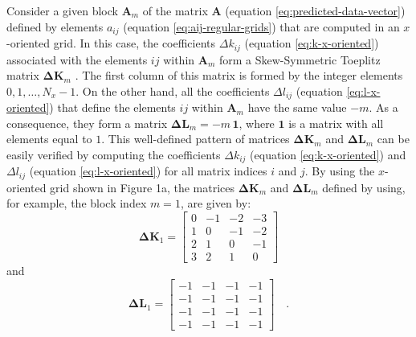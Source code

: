\documentclass[manuscript,revised]{geophysics}
\begin{document}
Consider a given block $\mathbf{A}_{m}$ of the matrix $\mathbf{A}$
(equation \ref{eq:predicted-data-vector}) defined by elements $a_{ij}$ 
(equation \ref{eq:aij-regular-grids}) that are computed in an $x$-oriented grid. 
In this case, the coefficients $\Delta k_{ij}$ 
(equation \ref{eq:k-x-oriented}) associated with the elements $ij$ within 
$\mathbf{A}_{m}$ form a Skew-Symmetric Toeplitz matrix $\mathbf{\Delta K}_{m}$ 
\citep[][ p. 161]{golub-vanloan2013}. The first column of this matrix is formed 
by the integer elements $0, 1, \dots, N_{x} - 1$.
On the other hand, all the coefficients $\Delta l_{ij}$ (equation \ref{eq:l-x-oriented})
that define the elements $ij$ within $\mathbf{A}_{m}$ have the same value $-m$. 
As a consequence, they form a matrix $\mathbf{\Delta L}_{m} = -m \, \mathbf{1}$, 
where $\mathbf{1}$ is a matrix with all elements equal to $1$. 
This well-defined pattern of matrices 
$\mathbf{\Delta K}_{m}$ and $\mathbf{\Delta L}_{m}$ can be easily verified by computing
the coefficients $\Delta k_{ij}$ (equation \ref{eq:k-x-oriented}) and
$\Delta l_{ij}$ (equation \ref{eq:l-x-oriented}) for all matrix indices $i$ and $j$.
By using the $x$-oriented grid shown in Figure 1a, the matrices $\mathbf{\Delta K}_{m}$
and $\mathbf{\Delta L}_{m}$ defined by using, for example, the block index $m = 1$, are
given by:
\begin{equation}
\mathbf{\Delta K}_{1} = \begin{bmatrix}
0 & -1 & -2 & -3 \\
1 & 0 & -1 & -2 \\
2 & 1 & 0 & -1 \\
3 & 2 & 1 & 0
\end{bmatrix}
\label{eq:K1-x-oriented-example}
\end{equation}
and
\begin{equation}
\mathbf{\Delta L}_{1} = \begin{bmatrix}
-1 & -1 & -1 & -1 \\
-1 & -1 & -1 & -1 \\
-1 & -1 & -1 & -1 \\
-1 & -1 & -1 & -1
\end{bmatrix} \quad .
\label{eq:L1-x-oriented-example}
\end{equation}
\end{document}
